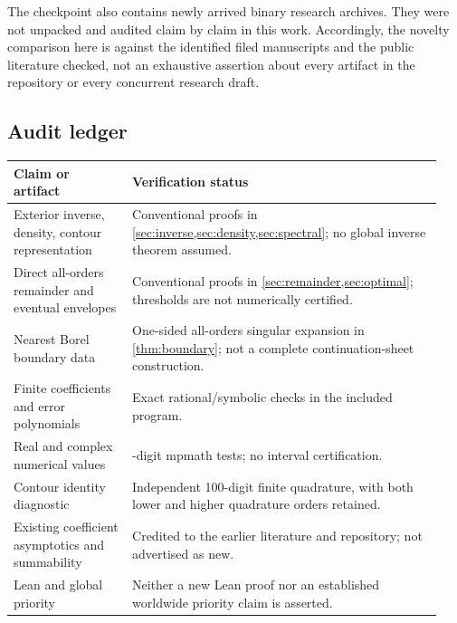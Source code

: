 \documentclass[11pt,a4paper]{article}
\theoremstyle{definition}
\numberwithin{equation}{section}
\begin{document}
The checkpoint also contains newly arrived binary research archives. They were not unpacked and audited claim by claim in this work. Accordingly, the novelty comparison here is against the identified filed manuscripts and the public literature checked, not an exhaustive assertion about every artifact in the repository or every concurrent research draft.

\subsection{Audit ledger}
\begin{longtable}{@{}>{\raggedright\arraybackslash}p{0.26\linewidth}>{\raggedright\arraybackslash}p{0.68\linewidth}@{}}
\toprule
Claim or artifact & Verification status\\
\midrule
\endhead
Exterior inverse, density, contour representation & Conventional proofs in \cref{sec:inverse,sec:density,sec:spectral}; no global inverse theorem assumed.\\[3pt]
Direct all-orders remainder and eventual envelopes & Conventional proofs in \cref{sec:remainder,sec:optimal}; thresholds are not numerically certified.\\[3pt]
Nearest Borel boundary data & One-sided all-orders singular expansion in \cref{thm:boundary}; not a complete continuation-sheet construction.\\[3pt]
Finite coefficients and error polynomials & Exact rational/symbolic checks in the included program.\\[3pt]
Real and complex numerical values & 240-digit mpmath tests; no interval certification.\\[3pt]
Contour identity diagnostic & Independent 100-digit finite quadrature, with both lower and higher quadrature orders retained.\\[3pt]
Existing coefficient asymptotics and summability & Credited to the earlier literature and repository; not advertised as new.\\[3pt]
Lean and global priority & Neither a new Lean proof nor an established worldwide priority claim is asserted.\\
\bottomrule
\end{longtable}
\end{document}
